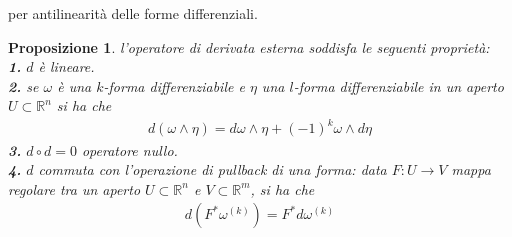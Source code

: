 \documentclass[oneside, 11pt]{amsbook}
\newcommand{\0}{{(0)}}
\newcommand{\3}{{(3)}}
\theoremstyle{colonplain}
\newtheorem{prop}[thm]{Proposizione}
\theoremstyle{colondefinition}
\theoremstyle{colonremark}
\numberwithin{equation}{chapter}
\begin{document}
per antilinearità delle forme differenziali.
\begin{prop} l'operatore di derivata esterna soddisfa le seguenti proprietà: \\
\textbf{1.} $d$ è lineare. \\
\textbf{2.} se $\omega$ è una $k$-forma differenziabile e $\eta$ una $l$-forma differenziabile in un aperto $U \subset \mathbb{R}^n$ si ha che
\begin{align}
    d(\omega \wedge \eta) = d\omega \wedge \eta + (-1)^k\omega \wedge d\eta
\end{align}
\textbf{3.} $d \circ d = 0$ operatore nullo. \\
\textbf{4.} $d$ commuta con l'operazione di pullback di una forma: data $F : U \longrightarrow V$ mappa regolare tra un aperto $U \subset \mathbb{R}^n$ e $V \subset \mathbb{R}^m$, si ha che
\begin{align}
    d(F^*\omega^{(k)}) = F^*d\omega^{(k)}
\end{align}
\end{prop}
\end{document}
